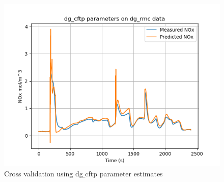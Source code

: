 \begin{figure}[H]
\begin{minipage}{0.3\textwidth}
        \end{minipage}
        \begin{minipage}{0.3\textwidth}
                \includegraphics[width = \textwidth]{./figs/figs_new_mdl/dg_cftp_dg_rmc.png}
        \end{minipage}
        \caption{Cross validation using dg$\_$cftp parameter estimates}
\end{figure}

